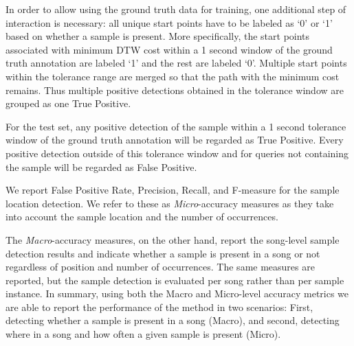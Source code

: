 \documentclass{article}
\begin{document}
In order to allow using the ground truth data for training, one additional step of interaction is necessary: all unique start points have to be labeled as `0' or `1' based on whether a sample is present. %
More specifically, the start points associated with minimum DTW cost within a 1 second window of the ground truth annotation are labeled `1' and the rest are labeled `0'. Multiple start points within the tolerance range are merged so that the path with the minimum cost remains. Thus multiple positive detections obtained in the tolerance window are grouped as one True Positive. %

For the test set, any positive detection of the sample within a 1 second tolerance window of the ground truth annotation will be regarded as True Positive. Every positive detection outside of this tolerance window and for queries not containing the sample will be regarded as False Positive.

We report False Positive Rate, Precision, Recall, and F-measure for the sample location detection. We refer to these as \textit{Micro}-accuracy measures as they take into account the sample location and the number of occurrences.

The \textit{Macro}-accuracy measures, on the other hand, report the song-level sample detection results and indicate whether a sample is present in a song or not regardless of position and number of occurrences. The same measures are reported, but the sample detection is evaluated per song rather than per sample instance.
In summary, using both the Macro and Micro-level accuracy metrics we are able to report the performance of the method in two scenarios: First, detecting whether a sample is present in a song (Macro), and second, detecting where in a song and how often a given sample is present (Micro).
\end{document}
